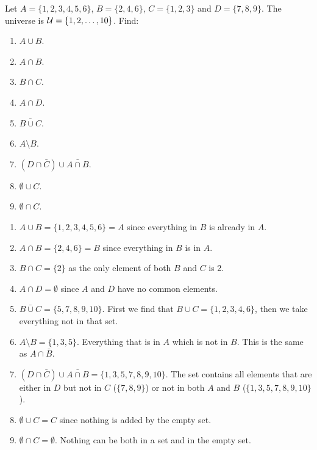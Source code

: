 \documentclass[12pt]{article}
\begin{document}
\begin{example}
 Let $A = \{1, 2, 3, 4, 5, 6\}$, $B = \{2, 4, 6\}$, $C = \{1, 2, 3\}$ and $D = \{7, 8, 9\}$.  The universe is $\mathcal U = \{1, 2, \ldots, 10\}$.  Find:
\begin{multicols}{3}
 \begin{enumerate}
  \item $A \cup B$.
\item $A \cap B$.
\item $B \cap C$.
\item $A \cap D$.
\item $\bar{B \cup C}$.
\item $A \setminus B$.
\item $(D \cap \bar C) \cup \bar{A \cap B}$.
\item $\emptyset \cup C$.
\item $\emptyset \cap C$.
 \end{enumerate}
\end{multicols}

\clearpage

\begin{solution}
  \begin{enumerate}
  \item $A \cup B = \{1, 2, 3, 4, 5, 6\} = A$ since everything in $B$ is already in $A$.
\item $A \cap B = \{2, 4, 6\} = B$ since everything in $B$ is in $A$.
\item $B \cap C = \{2\}$ as the only element of both $B$ and $C$ is 2.
\item $A \cap D = \emptyset$ since $A$ and $D$ have no common elements.
\item $\bar{B \cup C} = \{5, 7, 8, 9, 10\}$.  First we find that $B \cup C = \{1, 2, 3, 4, 6\}$, then we take everything not in that set.
\item $A \setminus B = \{1, 3, 5\}$.  Everything that is in $A$ which is not in $B$.  This is the same as $A \cap \bar B$.
\item $(D \cap \bar C) \cup \bar{A \cap B} = \{1, 3, 5, 7, 8, 9, 10\}.$ The set contains all elements that are either in $D$ but not in $C$ ($\{7,8,9\}$) or not in both $A$ and $B$ ($\{1,3,5,7,8,9,10\}$).
\item $\emptyset \cup C = C$ since nothing is added by the empty set.
\item $\emptyset \cap C = \emptyset$.  Nothing can be both in a set and in the empty set.
 \end{enumerate}
\end{solution}
\end{example}
\end{document}
